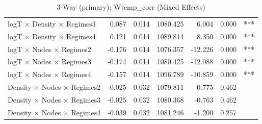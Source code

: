 \begin{table}[ht]
\begin{tabular}{lrrrrrl}
  logT × Density × Regimes3 & 0.087 & 0.014 & 1080.425 & 6.004 & 0.000 & *** \\ 
  logT × Density × Regimes4 & 0.121 & 0.014 & 1089.814 & 8.350 & 0.000 & *** \\ 
  logT × Nodes × Regimes2 & -0.176 & 0.014 & 1076.357 & -12.226 & 0.000 & *** \\ 
  logT × Nodes × Regimes3 & -0.174 & 0.014 & 1080.425 & -12.088 & 0.000 & *** \\ 
  logT × Nodes × Regimes4 & -0.157 & 0.014 & 1096.789 & -10.859 & 0.000 & *** \\ 
  Density × Nodes × Regimes2 & -0.025 & 0.032 & 1079.811 & -0.775 & 0.462 &  \\ 
  Density × Nodes × Regimes3 & -0.025 & 0.032 & 1080.368 & -0.763 & 0.462 &  \\ 
  Density × Nodes × Regimes4 & -0.039 & 0.032 & 1081.246 & -1.200 & 0.257 &  \\ 
   \hline
\end{tabular}
\caption{3-Way (primary): Wtemp_corr (Mixed Effects)} 
\end{table}
